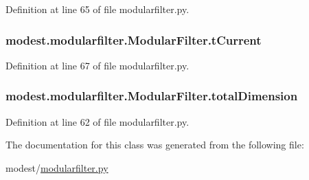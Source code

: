 Definition at line 65 of file modularfilter.\+py.

\subsubsection[{\texorpdfstring{t\+Current}{tCurrent}}]{\setlength{\rightskip}{0pt plus 5cm}modest.\+modularfilter.\+Modular\+Filter.\+t\+Current}\hypertarget{classmodest_1_1modularfilter_1_1ModularFilter_a917f511b39632b804f3ecf667f5a6d96}{}\label{classmodest_1_1modularfilter_1_1ModularFilter_a917f511b39632b804f3ecf667f5a6d96}


Definition at line 67 of file modularfilter.\+py.

\subsubsection[{\texorpdfstring{total\+Dimension}{totalDimension}}]{\setlength{\rightskip}{0pt plus 5cm}modest.\+modularfilter.\+Modular\+Filter.\+total\+Dimension}\hypertarget{classmodest_1_1modularfilter_1_1ModularFilter_ae7028964e7e7adf58d75b76aef9783f6}{}\label{classmodest_1_1modularfilter_1_1ModularFilter_ae7028964e7e7adf58d75b76aef9783f6}


Definition at line 62 of file modularfilter.\+py.



The documentation for this class was generated from the following file\+:\begin{DoxyCompactItemize}
\item 
modest/\hyperlink{modularfilter_8py}{modularfilter.\+py}\end{DoxyCompactItemize}
